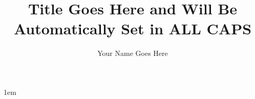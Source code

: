 \documentclass[draftthesis,tocnosub,noragright,centerchapter,fullpagesingle,12pt]{uiuc_csthesis21}
\title{Title Goes Here and Will Be Automatically Set in ALL CAPS}
\author{Your Name Goes Here}
\theoremstyle{definition}
\numberwithin{algocf}{chapter}     %
\begin{document}
%
\copyrightpage
\blankpage

%
\maketitle

\parindent 1em%

\frontmatter

%
\begin{abstract}
\end{abstract}

%

%
\begin{acknowledgments}
\end{acknowledgments}

%
\tableofcontents

\mainmatter

%


\end{document}
